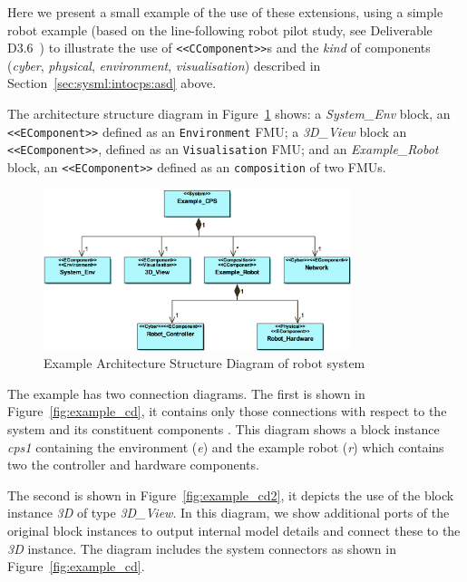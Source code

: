 Here we present a small example of the use of these extensions, using a simple robot example (based on the line-following robot pilot study, see Deliverable D3.6~\cite{INTOCPSD3.6}) to illustrate the use of \texttt{<<CComponent>>}s and the \emph{kind} of components (\emph{cyber}, \emph{physical}, \emph{environment}, \emph{visualisation}) described in Section~\ref{sec:sysml:intocps:asd} above.

The architecture structure diagram in Figure~\ref{fig:example_asd} shows: a \emph{System\_Env} block, an \texttt{<<EComponent>>} defined as an \texttt{Environment} FMU; a \emph{3D\_View} block an \texttt{<<EComponent>>}, defined as an \texttt{Visualisation} FMU; and an \emph{Example\_Robot} block, an \texttt{<<EComponent>>} defined as an \texttt{composition} of two FMUs.

\begin{figure}
\centering
\includegraphics[width=0.8\textwidth]{figures/E_Blocks_ext_asd}
\caption{Example Architecture Structure Diagram of robot system}
\label{fig:example_asd}
\end{figure}

The example has two connection diagrams. The first is shown in Figure~\ref{fig:example_cd}, it contains only those connections with respect to the system and its constituent components . This diagram shows a block instance \emph{cps1} containing the environment (\emph{e}) and the example robot (\emph{r}) which  contains two the controller and hardware components.

The second is shown in Figure~\ref{fig:example_cd2}, it depicts the use of the block instance \emph{3D} of type \emph{3D\_View}. In this diagram, we show additional ports of the original block instances to output internal model details and connect these to the \emph{3D} instance. The diagram includes the system connectors as shown in Figure~\ref{fig:example_cd}.

